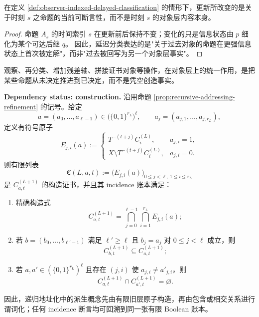 \begin{proposition}[延迟分类不改写过去]\label{prop:observer-indexed-delayed-classification-not-retrocausal}
在定义 \ref{def:observer-indexed-delayed-classification} 的情形下，更新所改变的是关于时刻 \(s\) 之命题的当前可断言性，而不是时刻 \(s\) 的对象层内容本身。
\end{proposition}

\begin{proof}
命题 \(A_s\) 的时间索引 \(s\) 在更新前后保持不变；变化的只是信息状态由 \(p\) 细化为某个可达后继 \(q\)。
因此，延迟分类表达的是"关于过去对象的命题在更强信息状态上首次被定解"，而非"过去被回写为另一个对象层事实"。
\end{proof}

\begin{corollary}[观察更新的对象层意义]\label{cor:observer-indexed-update-decides-not-create}
观察、再分类、增加残差轴、拼接证书对象等操作，在对象层上的统一作用，是把某些命题从未决定推进到已决定，而不是凭空创造事实。
\end{corollary}

\begin{proposition}\label{prop:distill-euclid-elements-recursive-cylinder-construction-certificate}
\textbf{Dependency status: construction.}
沿用命题 \ref{prop:recursive-addressing-refinement} 的记号。给定
\[
a=(a_0,\ldots,a_{\ell-1})\in\bigl(\{0,1\}^{r_L}\bigr)^\ell,
\qquad
a_j=(a_{j,1},\ldots,a_{j,r_L}),
\]
定义有符号原子
\[
E_{j,i}(a):=
\begin{cases}
T^{-(t+j)}C_i^{(L)},& a_{j,i}=1,\\
X\setminus T^{-(t+j)}C_i^{(L)},& a_{j,i}=0.
\end{cases}
\]
则有限列表
\[
\mathfrak C(L,a,t):=\bigl(E_{j,i}(a)\bigr)_{0\le j<\ell,\ 1\le i\le r_L}
\]
是 \(C^{(L+1)}_{a,t}\) 的构造证书，并且其 incidence 账本满足：
\begin{enumerate}
  \item 精确构造式
  \[
  C^{(L+1)}_{a,t}
  =\bigcap_{j=0}^{\ell-1}\bigcap_{i=1}^{r_L}E_{j,i}(a);
  \]
  \item 若 \(b=(b_0,\ldots,b_{\ell'-1})\) 满足 \(\ell'\ge\ell\) 且 \(b_j=a_j\) 对 \(0\le j<\ell\) 成立，则
  \[
  C^{(L+1)}_{b,t}\subseteq C^{(L+1)}_{a,t};
  \]
  \item 若 \(a,a'\in(\{0,1\}^{r_L})^\ell\) 且存在 \((j,i)\) 使 \(a_{j,i}\ne a'_{j,i}\)，则
  \[
  C^{(L+1)}_{a,t}\cap C^{(L+1)}_{a',t}=\varnothing.
  \]
\end{enumerate}
因此，递归地址化中的派生概念先由有限旧层原子构造，再由包含或相交关系进行谓词化；任何 incidence 断言均可回溯到同一张有限 Boolean 账本。
\end{proposition}

